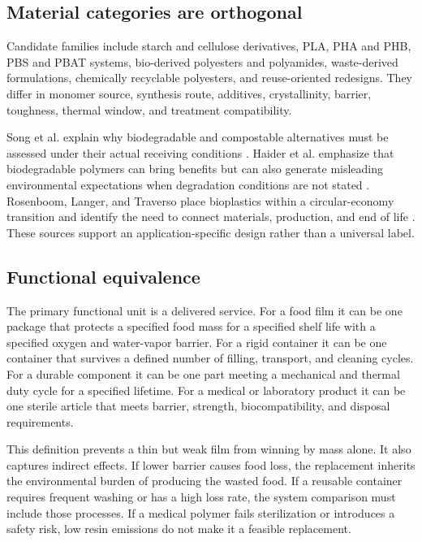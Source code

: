 \documentclass[conference]{IEEEtran}
\begin{document}
\subsection{Material categories are orthogonal}

Candidate families include starch and cellulose derivatives, PLA, PHA and PHB, PBS and PBAT systems, bio-derived polyesters and polyamides, waste-derived formulations, chemically recyclable polyesters, and reuse-oriented redesigns. They differ in monomer source, synthesis route, additives, crystallinity, barrier, toughness, thermal window, and treatment compatibility.

Song et al. explain why biodegradable and compostable alternatives must be assessed under their actual receiving conditions \cite{song}. Haider et al. emphasize that biodegradable polymers can bring benefits but can also generate misleading environmental expectations when degradation conditions are not stated \cite{haider}. Rosenboom, Langer, and Traverso place bioplastics within a circular-economy transition and identify the need to connect materials, production, and end of life \cite{rosenboom}. These sources support an application-specific design rather than a universal label.

\subsection{Functional equivalence}

The primary functional unit is a delivered service. For a food film it can be one package that protects a specified food mass for a specified shelf life with a specified oxygen and water-vapor barrier. For a rigid container it can be one container that survives a defined number of filling, transport, and cleaning cycles. For a durable component it can be one part meeting a mechanical and thermal duty cycle for a specified lifetime. For a medical or laboratory product it can be one sterile article that meets barrier, strength, biocompatibility, and disposal requirements.

This definition prevents a thin but weak film from winning by mass alone. It also captures indirect effects. If lower barrier causes food loss, the replacement inherits the environmental burden of producing the wasted food. If a reusable container requires frequent washing or has a high loss rate, the system comparison must include those processes. If a medical polymer fails sterilization or introduces a safety risk, low resin emissions do not make it a feasible replacement.
\end{document}
